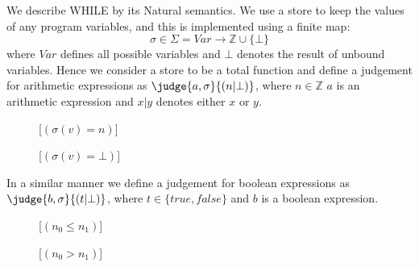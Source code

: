We describe WHILE by its Natural semantics.
We use a store to keep the values of any program variables, and this is implemented using a finite map:
$$\sigma \in \Sigma = Var \longrightarrow \mathbb{Z} \cup \{\bot\}$$
where $Var$ defines all possible variables and $\bot$ denotes the result of unbound variables.
Hence we consider a store to be a total function and define a judgement for arithmetic expressions as
$\judge{a,\sigma}{(n | \bot)}$, where $n \in \mathbb{Z}$ $a$ is an arithmetic expression and $x | y$ denotes either $x$ or $y$.

\begin{figure}[h!]
\inference[ACst]{}
{}

\inference[Var]{}
{}[$(\sigma(v) = n)$]

{}[$( \sigma(v) = \bot )$]

{}

{}

{}
\end{figure}

In a similar manner we define a judgement for boolean expressions as $\judge{b,\sigma}{(t | \bot)}$, where $t \in \{true, false\}$ and $b$ is a boolean expression.

\begin{figure}[h!]
\inference[BCst]{}
{}

{}[$(n_0 \leq n_1)$]

{}[$(n_0 > n_1)$]

{}

{}

{}

{}

{}

\end{figure}

